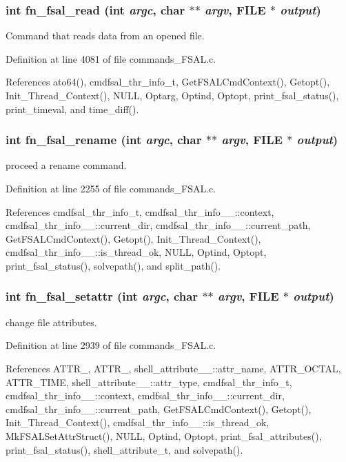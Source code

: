 \subsubsection{\setlength{\rightskip}{0pt plus 5cm}int fn\_\-fsal\_\-read (int {\em argc}, char $\ast$$\ast$ {\em argv}, FILE $\ast$ {\em output})}\label{commands__FSAL_8c_a39}


Command that reads data from an opened file. 

Definition at line 4081 of file commands\_\-FSAL.c.

References ato64(), cmdfsal\_\-thr\_\-info\_\-t, Get\-FSALCmd\-Context(), Getopt(), Init\_\-Thread\_\-Context(), NULL, Optarg, Optind, Optopt, print\_\-fsal\_\-status(), print\_\-timeval, and time\_\-diff().
\subsubsection{\setlength{\rightskip}{0pt plus 5cm}int fn\_\-fsal\_\-rename (int {\em argc}, char $\ast$$\ast$ {\em argv}, FILE $\ast$ {\em output})}\label{commands__FSAL_8c_a29}


proceed a rename command. 

Definition at line 2255 of file commands\_\-FSAL.c.

References cmdfsal\_\-thr\_\-info\_\-t, cmdfsal\_\-thr\_\-info\_\-\_\-::context, cmdfsal\_\-thr\_\-info\_\-\_\-::current\_\-dir, cmdfsal\_\-thr\_\-info\_\-\_\-::current\_\-path, Get\-FSALCmd\-Context(), Getopt(), Init\_\-Thread\_\-Context(), cmdfsal\_\-thr\_\-info\_\-\_\-::is\_\-thread\_\-ok, NULL, Optind, Optopt, print\_\-fsal\_\-status(), solvepath(), and split\_\-path().
\subsubsection{\setlength{\rightskip}{0pt plus 5cm}int fn\_\-fsal\_\-setattr (int {\em argc}, char $\ast$$\ast$ {\em argv}, FILE $\ast$ {\em output})}\label{commands__FSAL_8c_a33}


change file attributes. 

Definition at line 2939 of file commands\_\-FSAL.c.

References ATTR\_, ATTR\_, shell\_\-attribute\_\-\_\-::attr\_\-name, ATTR\_\-OCTAL, ATTR\_\-TIME, shell\_\-attribute\_\-\_\-::attr\_\-type, cmdfsal\_\-thr\_\-info\_\-t, cmdfsal\_\-thr\_\-info\_\-\_\-::context, cmdfsal\_\-thr\_\-info\_\-\_\-::current\_\-dir, cmdfsal\_\-thr\_\-info\_\-\_\-::current\_\-path, Get\-FSALCmd\-Context(), Getopt(), Init\_\-Thread\_\-Context(), cmdfsal\_\-thr\_\-info\_\-\_\-::is\_\-thread\_\-ok, Mk\-FSALSet\-Attr\-Struct(), NULL, Optind, Optopt, print\_\-fsal\_\-attributes(), print\_\-fsal\_\-status(), shell\_\-attribute\_\-t, and solvepath().

